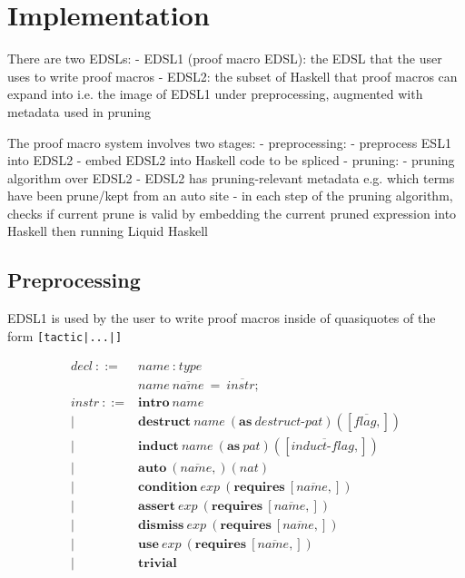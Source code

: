 \section{Implementation}

There are two EDSLs:
- EDSL1 (proof macro EDSL): the EDSL that the user uses to write proof macros
- EDSL2: the subset of Haskell that proof macros can expand into i.e. the image of EDSL1 under preprocessing, augmented with metadata used in pruning

The proof macro system involves two stages:
- preprocessing:
  - preprocess ESL1 into EDSL2
  - embed EDSL2 into Haskell code to be spliced
- pruning:
  - pruning algorithm over EDSL2 
    - EDSL2 has pruning-relevant metadata e.g. which terms have been prune/kept from an auto site
    - in each step of the pruning algorithm, checks if current prune is valid by embedding the current pruned expression into Haskell then running Liquid Haskell

\subsection{Preprocessing}

EDSL1 is used by the user to write proof macros inside of quasiquotes of the form \texttt{[tactic|...|]}

\begin{align*}
  \textit{decl}~ ::= &
    \textit{name} ~ : ~ \textit{type} \\ &
    \textit{name} ~ \overline{\textit{name}} ~ = ~ \overline{\textit{instr} ; }
  \\
  \textit{instr} ~ ::= &
    \textbf{intro} ~ \textit{name} \\ | &
    \textbf{destruct} ~ \textit{name} ~ (\textbf{as} ~ \textit{destruct-pat}) ([\overline{\textit{flag},}]) \\ | &
    \textbf{induct} ~ \textit{name} ~ (\textbf{as} ~ \textit{pat}) ([\overline{\textit{induct-flag},}]) \\ | &
    \textbf{auto} ~ (\overline{\textit{name},}) (\textit{nat}) \\ | &
    \textbf{condition} ~ \textit{exp} ~ (\textbf{requires} ~ [\overline{\textit{name},}]) \\ | &
    \textbf{assert} ~ \textit{exp} ~ (\textbf{requires} ~ [\overline{\textit{name},}]) \\ | &
    \textbf{dismiss} ~ \textit{exp} ~ (\textbf{requires} ~ [\overline{\textit{name},}]) \\ | &
    \textbf{use} ~ \textit{exp} ~ (\textbf{requires} ~ [\overline{\textit{name},}]) \\ | &
    \textbf{trivial}
\end{align*}

